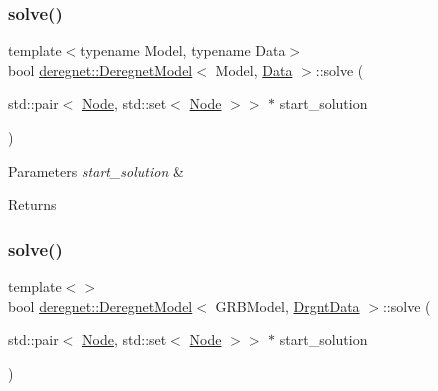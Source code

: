 \subsubsection{\texorpdfstring{solve()}{solve()}\hspace{0.1cm}{\footnotesize\ttfamily [1/3]}}
{\footnotesize\ttfamily template$<$typename Model, typename Data$>$ \\
bool \hyperlink{classderegnet_1_1DeregnetModel}{deregnet\+::\+Deregnet\+Model}$<$ Model, \hyperlink{avgdrgnt_8cpp_a1d1235306db276e9b36acba1db1509e8}{Data} $>$\+::solve (\begin{DoxyParamCaption}\item[{std\+::pair$<$ \hyperlink{namespacederegnet_a744bad34f2de9856d36715a445f027f3}{Node}, std\+::set$<$ \hyperlink{namespacederegnet_a744bad34f2de9856d36715a445f027f3}{Node} $>$$>$ $\ast$}]{start\+\_\+solution }\end{DoxyParamCaption})}


\begin{DoxyParams}{Parameters}
{\em start\+\_\+solution} & \\
\hline
\end{DoxyParams}
\begin{DoxyReturn}{Returns}

\end{DoxyReturn}
\mbox{\label{classderegnet_1_1DeregnetModel_a92c977d9b126c69653401fc45d43879c}} 
\subsubsection{\texorpdfstring{solve()}{solve()}\hspace{0.1cm}{\footnotesize\ttfamily [2/3]}}
{\footnotesize\ttfamily template$<$$>$ \\
bool \hyperlink{classderegnet_1_1DeregnetModel}{deregnet\+::\+Deregnet\+Model}$<$ G\+R\+B\+Model, \hyperlink{classderegnet_1_1DrgntData}{Drgnt\+Data} $>$\+::solve (\begin{DoxyParamCaption}\item[{std\+::pair$<$ \hyperlink{namespacederegnet_a744bad34f2de9856d36715a445f027f3}{Node}, std\+::set$<$ \hyperlink{namespacederegnet_a744bad34f2de9856d36715a445f027f3}{Node} $>$$>$ $\ast$}]{start\+\_\+solution }\end{DoxyParamCaption})\hspace{0.3cm}{\ttfamily [inline]}}



